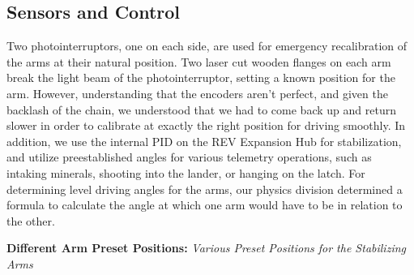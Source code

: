 \begin{figure}[h!]
\begin{minipage}{.32\textwidth}
\end{minipage}
\end{figure}

\subsection*{Sensors and Control}
Two photointerruptors, one on each side, are used for emergency recalibration of the arms at their natural position. Two laser cut wooden flanges on each arm break the light beam of the photointerruptor, setting a known position for the arm. However, understanding that the encoders aren't perfect, and given the backlash of the chain, we understood that we had to come back up and return slower in order to calibrate at exactly the right position for driving smoothly. In addition, we use the internal PID on the REV Expansion Hub for stabilization, and utilize preestablished angles for various telemetry operations, such as intaking minerals, shooting into the lander, or hanging on the latch. For determining level driving angles for the arms, our physics division determined a formula to calculate the angle at which one arm would have to be in relation to the other. 


\vskip 0.35in
\textbf{Different Arm Preset Positions:}
\textit{Various Preset Positions for the Stabilizing Arms}


